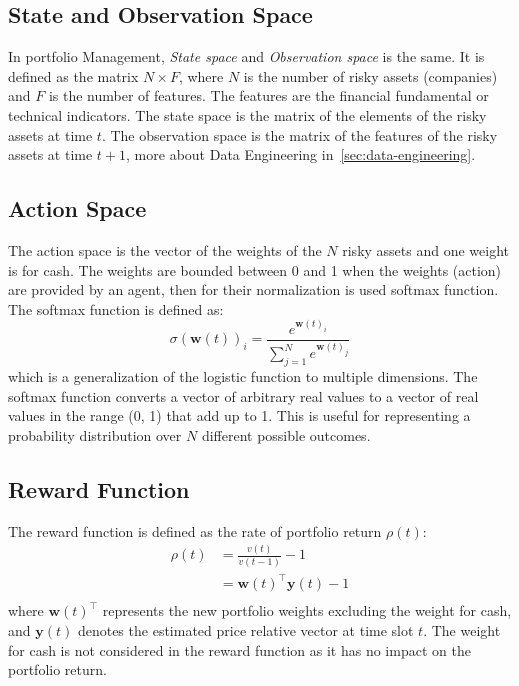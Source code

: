 \documentclass[../xlapes02]{subfiles}
\begin{document}
    \subsection{State and Observation Space}\label{subsec:state-space}
    In portfolio Management, \emph{State space} and \emph{Observation space} is the same. It is defined as the matrix $N\times F$, where $N$ is the number of risky assets (companies) and $F$ is the number of features. The features are the financial fundamental or technical indicators. The state space is the matrix of the elements of the risky assets at time $t$. The observation space is the matrix of the features of the risky assets at time $t+1$, more about Data Engineering in~\cref{sec:data-engineering}.

    \subsection{Action Space}\label{subsec:action-space}
    The action space is the vector of the weights of the $N$ risky assets and one weight is for cash. The weights are bounded between 0 and 1 when the weights (action) are provided by an agent, then for their normalization is used softmax function. The softmax function is defined as:
    \begin{equation}
        \sigma(\bm{w}(t))_i=\frac{e^{\bm{w}(t)_i}}{\sum_{j=1}^{N}e^{\bm{w}(t)_j}}
    \end{equation}
    which is a generalization of the logistic function to multiple dimensions. The softmax function converts a vector of arbitrary real values to a vector of real values in the range (0, 1) that add up to 1. This is useful for representing a probability distribution over $N$ different possible outcomes.

    \subsection{Reward Function}\label{subsec:reward-function}
    The reward function is defined as the rate of portfolio return $\rho(t)$:
    \begin{equation}
        \begin{split}
            \rho(t)&=\frac{v(t)}{v(t-1)}-1\\
            &=\mathbf{w}(t)^\top\mathbf{y}(t)-1\\
        \end{split}
    \end{equation}
    where $\mathbf{w}(t)^\top$ represents the new portfolio weights excluding the weight for cash, and $\mathbf{y}(t)$ denotes the estimated price relative vector at time slot $t$. The weight for cash is not considered in the reward function as it has no impact on the portfolio return.
\end{document}
